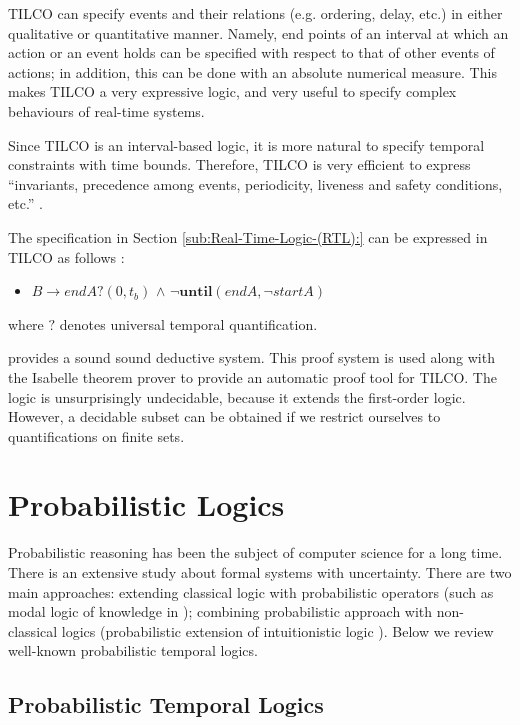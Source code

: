 \documentclass[11pt]{article}
\begin{document}
TILCO can specify events and their relations (e.g. ordering, delay, etc.) in either qualitative or quantitative manner. Namely, end points of an interval at which an action or an event holds can be specified with respect to that of other events of actions; in addition, this can be done with an absolute numerical measure.  This makes TILCO a very expressive logic, and very useful to specify complex behaviours of real-time systems. 

Since TILCO is an interval-based logic, it is more natural to specify temporal constraints with time bounds.  Therefore, TILCO is very efficient to express ``invariants, precedence among events, periodicity, liveness and safety conditions, etc.'' \cite{BMN00}. 

The specification in Section \ref{sub:Real-Time-Logic-(RTL):} can be expressed in TILCO as follows \cite{BMN00}:

\begin{itemize}
\item $B\rightarrow endA?(0,t_{b})$ $\wedge$ $\neg\mathbf{until}(endA,\neg startA)$
\end{itemize}

\noindent where $?$ denotes universal temporal quantification.

 \cite{Mat96,MN00} provides a sound sound deductive system. This proof system is used along with the Isabelle theorem prover  \cite{Pau94} to provide an automatic proof tool for TILCO. The logic is unsurprisingly undecidable, because it extends the first-order logic. However, a decidable subset can be obtained if we restrict ourselves to quantifications on finite sets.
 
\section{Probabilistic Logics}

Probabilistic reasoning has been the subject of computer science for a long time. There is an extensive study about formal systems with uncertainty. There are two main approaches: extending classical logic with probabilistic operators (such as modal logic of knowledge in \cite{FH94}); combining probabilistic approach with non-classical logics (probabilistic extension of intuitionistic logic \cite{MOR03}). Below we review well-known probabilistic temporal logics.
 
\subsection{Probabilistic Temporal Logics}
\end{document}
